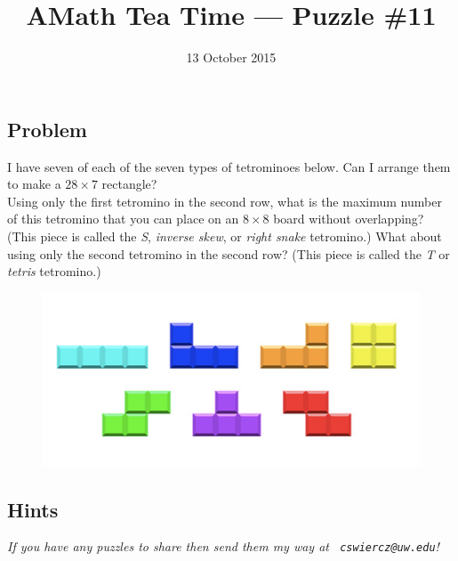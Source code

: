 \documentclass[12pt]{article}
\title{AMath Tea Time --- Puzzle \#11}
\author{}
\date{\vspace{-1cm}13 October 2015}
\begin{document}
\maketitle
{}

\subsection*{Problem}

 I have seven of each of the seven types of
tetrominoes below. Can I arrange them to make a $28 \times 7$ rectangle? \\

 Using only the first tetromino in the second row,
what is the maximum number of this tetromino that you can place on an $8 \times
8$ board without overlapping? (This piece is called the {\it S}, {\it inverse
  skew}, or {\it right snake} tetromino.) What about using only the second
tetromino in the second row? (This piece is called the {\it T} or {\it tetris}
tetromino.)

\begin{figure}[h]
  \centering
  \includegraphics[width=.75\textwidth]{tetromino.png}
\end{figure}

\subsection*{Hints}

{
\par\vspace*{\fill}
\noindent \small \it
If you have any puzzles to share then send them my way at {\tt
  cswiercz@uw.edu}!
}
\end{document}
